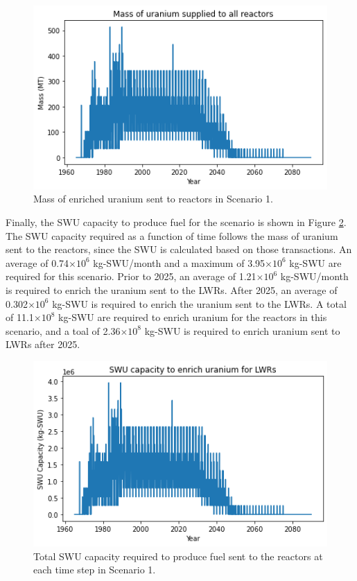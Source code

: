 \begin{figure}
    \centering 
    \includegraphics[width=\textwidth]{../figures/fuelsupply_scenarios_1.png}
    \caption{Mass of enriched uranium sent to reactors in Scenario 1.}
    \label{fig:fuel_1}
\end{figure}

Finally, the \gls{SWU} capacity to produce fuel for the scenario is shown in 
Figure \ref{fig:swu_1}. The \gls{SWU} capacity required as a function of 
time follows the mass of uranium sent to the reactors, since the \gls{SWU}
is calculated based on those transactions. An average of 0.74$\times 10^6$
kg-\gls{SWU}/month and a maximum of 3.95$\times 10^6$ kg-\gls{SWU} are 
required for this scenario. Prior to 2025, an average of 1.21$\times 10^6$ 
kg-\gls{SWU}/month is required to enrich the uranium sent to the \glspl{LWR}.
After 2025, an average of 0.302$\times 10^6$ kg-\gls{SWU} is required to 
enrich the uranium sent to the \glspl{LWR}.
A total of 11.1$\times 10^8$ kg-SWU are required to enrich uranium for the 
reactors in this scenario, and a toal of 2.36$\times 10^8$ kg-SWU is required 
to enrich uranium sent to \glspl{LWR} after 2025. 

\begin{figure}
    \centering
    \includegraphics[width=\textwidth]{../figures/totalswu_scenarios_1.png}
    \caption{Total \gls{SWU} capacity required to produce fuel sent to the 
    reactors at each time step in Scenario 1.}
    \label{fig:swu_1}
\end{figure}

